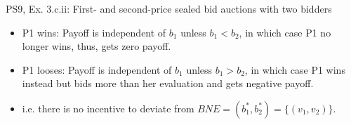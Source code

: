\begin{frame}{PS9, Ex. 3.c.ii: First- and second-price sealed bid auctions with two bidders}
\begin{multicols}{2}
      \vspace{-18pt}
      \begin{itemize}
        \item[(ii)] P1 wins: Payoff is independent of $b_1$ unless $b_1<b_2$, in which case P1 no longer wins, thus, gets zero payoff.
        \item[] P1 looses: Payoff is independent of $b_1$ unless $b_1>b_2$, in which case P1 wins instead but bids more than her evaluation and gets negative payoff.
        \item[] i.e. there is no incentive to deviate from $BNE=(b_1^*,b_2^*)=\{(v_1,v_2)\}$.
      \end{itemize}
      \vfill\null
    \end{multicols}
\end{frame}


